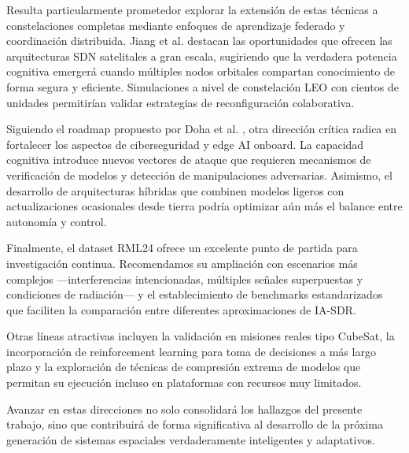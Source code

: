 Resulta particularmente prometedor explorar la extensión de estas técnicas a constelaciones completas mediante enfoques de aprendizaje federado y coordinación distribuida. Jiang et al. \cite{Jiang2023} destacan las oportunidades que ofrecen las arquitecturas SDN satelitales a gran escala, sugiriendo que la verdadera potencia cognitiva emergerá cuando múltiples nodos orbitales compartan conocimiento de forma segura y eficiente. Simulaciones a nivel de constelación LEO con cientos de unidades permitirían validar estrategias de reconfiguración colaborativa.

Siguiendo el roadmap propuesto por Doha et al. \cite{Doha2026}, otra dirección crítica radica en fortalecer los aspectos de ciberseguridad y edge AI onboard. La capacidad cognitiva introduce nuevos vectores de ataque que requieren mecanismos de verificación de modelos y detección de manipulaciones adversarias. Asimismo, el desarrollo de arquitecturas híbridas que combinen modelos ligeros con actualizaciones ocasionales desde tierra podría optimizar aún más el balance entre autonomía y control.

Finalmente, el dataset RML24 \cite{Zhang2026} ofrece un excelente punto de partida para investigación continua. Recomendamos su ampliación con escenarios más complejos —interferencias intencionadas, múltiples señales superpuestas y condiciones de radiación— y el establecimiento de benchmarks estandarizados que faciliten la comparación entre diferentes aproximaciones de IA-SDR.

Otras líneas atractivas incluyen la validación en misiones reales tipo CubeSat, la incorporación de reinforcement learning para toma de decisiones a más largo plazo y la exploración de técnicas de compresión extrema de modelos que permitan su ejecución incluso en plataformas con recursos muy limitados. 

Avanzar en estas direcciones no solo consolidará los hallazgos del presente trabajo, sino que contribuirá de forma significativa al desarrollo de la próxima generación de sistemas espaciales verdaderamente inteligentes y adaptativos.